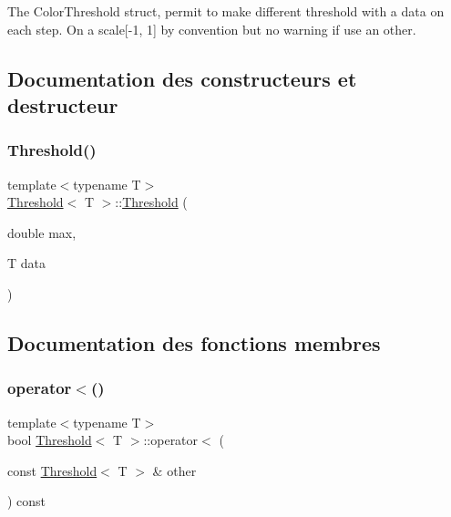 The Color\+Threshold struct, permit to make different threshold with a data on each step. On a scale\mbox{[}-\/1, 1\mbox{]} by convention but no warning if use an other. 

\subsection{Documentation des constructeurs et destructeur}
\mbox{\label{struct_threshold_acff40589799e19c56704bf23fa25cdf5}} 
\subsubsection{\texorpdfstring{Threshold()}{Threshold()}}
{\footnotesize\ttfamily template$<$typename T$>$ \\
\hyperlink{struct_threshold}{Threshold}$<$ T $>$\+::\hyperlink{struct_threshold}{Threshold} (\begin{DoxyParamCaption}\item[{double}]{max,  }\item[{T}]{data }\end{DoxyParamCaption})\hspace{0.3cm}{\ttfamily [inline]}}



\subsection{Documentation des fonctions membres}
\mbox{\label{struct_threshold_a40250fbaa1d32ec4992aa7bc32480f00}} 
\subsubsection{\texorpdfstring{operator$<$()}{operator<()}}
{\footnotesize\ttfamily template$<$typename T$>$ \\
bool \hyperlink{struct_threshold}{Threshold}$<$ T $>$\+::operator$<$ (\begin{DoxyParamCaption}\item[{const \hyperlink{struct_threshold}{Threshold}$<$ T $>$ \&}]{other }\end{DoxyParamCaption}) const\hspace{0.3cm}{\ttfamily [inline]}}



